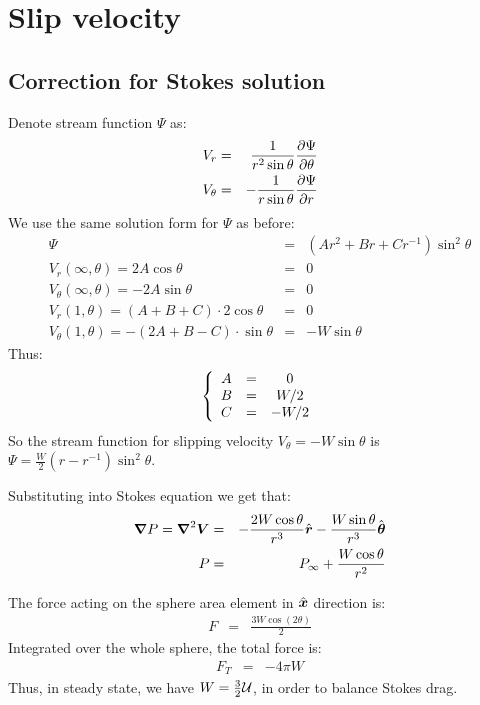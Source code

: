 \section{Slip velocity}
\subsection{Correction for Stokes solution}
Denote stream function $\Psi$ as:
\begin{eqnarray}
  V_r &=& \frac{1}{r^2 \sin\theta}\deriv{\Psi}{\theta} \\
  V_\theta &=& -\frac{1}{r \sin\theta}\deriv{\Psi}{r}
\end{eqnarray}
We use the same solution form for $\Psi$ as before:
\begin{eqnarray}
  \Psi &=& (A r^2 + B r + C r^{-1})\sin^2\theta\\
  V_r(\infty, \theta) = 2A \cos\theta &=& 0 \\
  V_\theta(\infty, \theta) = -2A \sin\theta &=& 0 \\
  V_r(1, \theta) = (A+B+C)\cdot 2\cos\theta &=& 0 \\
  V_\theta(1, \theta) = -(2A+B-C)\cdot \sin\theta &=& -W\sin\theta
\end{eqnarray}
Thus:
\begin{eqnarray}
  \brc{ccc}{A &=& 0 \\ B &=& W/2 \\ C &=& -W/2}
\end{eqnarray}
So the stream function for slipping velocity $V_\theta = -W\sin\theta$
is $\Psi = \frac{W}{2}(r - r^{-1})\sin^2\theta$.

Substituting into Stokes equation we get that:
\begin{eqnarray}
  \bnabla P = \bLaplacian \bV &=& -\frac{2 W \cos\theta}{r^3} \brhat
  -\frac{W \sin \theta}{r^3} \bthetahat \\
  P &=& P_\infty + \frac{W \cos\theta}{r^2}
\end{eqnarray}

The force acting on the sphere area element in $\bxhat$ direction is:
\begin{eqnarray}
  F &=& \frac{3W \cos(2\theta)}{2}
\end{eqnarray}
Integrated over the whole sphere, the total force is:
\begin{eqnarray}
  F_T &=& -4\pi W
\end{eqnarray}
Thus, in steady state, we have $W = \frac{3}{2} \cl{U}$,
in order to balance Stokes drag.
